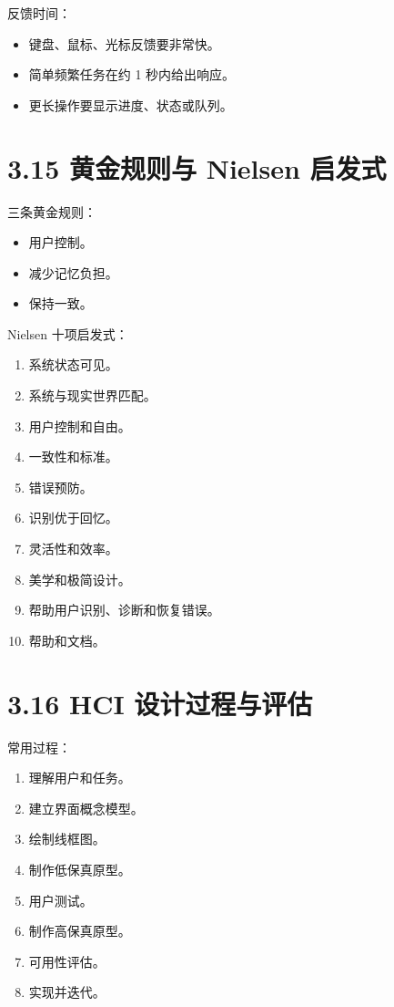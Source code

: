 \documentclass[UTF8,zihao=-4]{ctexart}
\begin{document}
反馈时间：

\begin{itemize}
\item 键盘、鼠标、光标反馈要非常快。
\item 简单频繁任务在约 1 秒内给出响应。
\item 更长操作要显示进度、状态或队列。
\end{itemize}

\section{3.15 黄金规则与 Nielsen 启发式}

三条黄金规则：

\begin{itemize}
\item 用户控制。
\item 减少记忆负担。
\item 保持一致。
\end{itemize}

Nielsen 十项启发式：

\begin{enumerate}
\item 系统状态可见。
\item 系统与现实世界匹配。
\item 用户控制和自由。
\item 一致性和标准。
\item 错误预防。
\item 识别优于回忆。
\item 灵活性和效率。
\item 美学和极简设计。
\item 帮助用户识别、诊断和恢复错误。
\item 帮助和文档。
\end{enumerate}

\section{3.16 HCI 设计过程与评估}

常用过程：

\begin{enumerate}
\item 理解用户和任务。
\item 建立界面概念模型。
\item 绘制线框图。
\item 制作低保真原型。
\item 用户测试。
\item 制作高保真原型。
\item 可用性评估。
\item 实现并迭代。
\end{enumerate}
\end{document}
